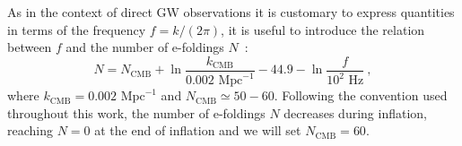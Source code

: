 As in the context of direct GW observations it is customary to express quantities in terms of the frequency $f = k / (2 \pi)$, it is useful to introduce the relation between $f$ and the number of e-foldings $N$~\cite{Barnaby:2011qe,Domcke:2016bkh}:
\begin{equation}
N = N_\text{CMB} + \ln \frac{k_\text{CMB}}{0.002 \text{ Mpc}^{-1}} - 44.9 - \ln\frac{f}{10^2 \text{ Hz}} \ ,
\label{review:Nf}
\end{equation}
where $k_\text{CMB} = 0.002 \text{ Mpc}^{-1}$ and $N_\text{CMB} \simeq 50 - 60$. Following the convention used throughout this work, the number of e-foldings $N$ decreases during inflation, reaching $N=0$ at the end of inflation and we will set $N_\text{CMB} = 60$.